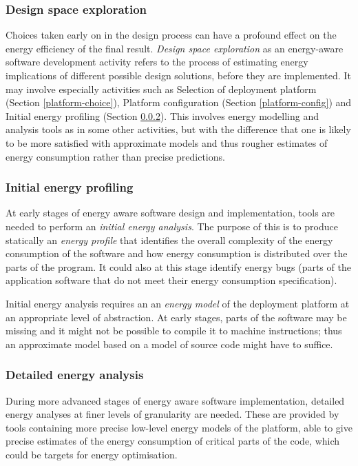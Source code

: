 \documentclass[11pt,oneside]{book}
\begin{document}
\subsubsection{Design space exploration}\label{space-expl}

Choices taken early on in the design process can have a profound effect on the
energy efficiency of the final result.  \emph{Design space exploration} as an 
energy-aware software development activity refers to the process of estimating
energy implications of different possible design solutions, before they are implemented.
It may involve especially activities such as Selection of deployment platform (Section \ref{platform-choice}), Platform configuration (Section \ref{platform-config}) and Initial energy profiling (Section \ref{init-energy}).
This involves energy modelling and analysis tools as in some other activities, but
with the difference that one is likely to be more satisfied with approximate models
and thus rougher estimates
of energy consumption rather than precise predictions.

\subsubsection{Initial energy profiling}\label{init-energy}

At early stages of energy aware software design and implementation, tools are needed 
to perform an \emph{initial energy analysis}.  The purpose
of this is to produce statically an \emph{energy profile} that
identifies the overall
complexity of the energy consumption of the software and how energy consumption is
distributed over the parts of the program.   It could also at this stage identify
energy bugs (parts of the application software that do not meet
their energy consumption specification).

Initial energy analysis requires an
an \emph{energy model} of the deployment platform at an appropriate
level of abstraction. At early stages, parts of the software may be missing
and it might not be possible to compile it to machine instructions; thus
an approximate model based on a model of source code might have to
suffice.

\subsubsection{Detailed energy analysis}\label{energy-analysis}

During more advanced stages of energy aware software implementation,
detailed energy analyses at finer levels of granularity are needed.
These are provided by tools containing more precise low-level energy models 
of the platform, able to give precise estimates of the energy consumption
of critical parts of the code, which could be targets for energy optimisation.  
\end{document}

